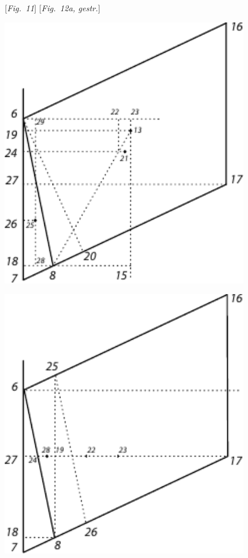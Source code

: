 \\
\\
\hspace*{27mm} [\textit{Fig.~11}] \label{LH_37_03_070v_Fig.11}\hspace*{48mm} [\textit{Fig.~12a, gestr.}]\label{LH_37_03_070v_Fig.12a}
\pend
\vspace{1.5em}
  \pstart 
\begin{minipage}[t]{0.5\textwidth}
\includegraphics[width=0.8\textwidth]{gesamttex/edit_VIII,3/images/LH_37_03_069-070_d12b.pdf}
\end{minipage}
\hspace{0mm}
\begin{minipage}[t]{0.5\textwidth}
\includegraphics[width=0.8\textwidth]{gesamttex/edit_VIII,3/images/LH_37_03_069-070_d12c.pdf}
\end{minipage}
